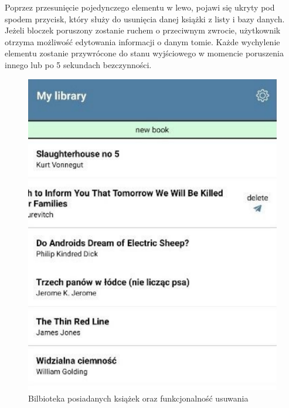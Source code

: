 Poprzez przesunięcie pojedynczego elementu w lewo, pojawi się ukryty pod spodem przycisk, który służy do usunięcia danej książki z listy i bazy danych. Jeżeli bloczek poruszony zostanie ruchem o przeciwnym zwrocie, użytkownik otrzyma możliwość edytowania informacji o danym tomie.
Każde wychylenie elementu zostanie przywrócone do stanu wyjściowego w momencie poruszenia innego lub po 5 sekundach bezczynności.
\begin{figure}[H]
	\centering
	\includegraphics{mylib.pdf}
	\caption{Bilbioteka posiadanych książek oraz funkcjonalność usuwania}
\end{figure}


